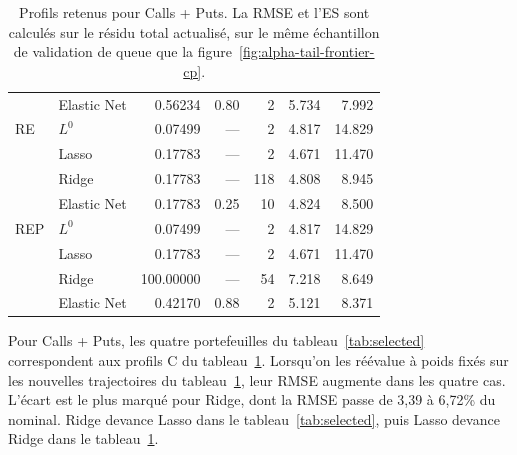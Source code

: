 \documentclass[12pt,a4paper]{article}
\newcommand{\1}{\mathbf{1}}
\begin{document}
\begin{minipage}{\linewidth}
\begin{table}[H]
\begin{tabular}{llrrrrr}
 & Elastic Net & 0.56234 & 0.80 & 2 & 5.734 & 7.992 \\
\addlinespace[2pt]
RE & $L^0$ & 0.07499 & --- & 2 & 4.817 & 14.829 \\
 & Lasso & 0.17783 & --- & 2 & 4.671 & 11.470 \\
 & Ridge & 0.17783 & --- & 118 & 4.808 & 8.945 \\
 & Elastic Net & 0.17783 & 0.25 & 10 & 4.824 & 8.500 \\
\addlinespace[2pt]
REP & $L^0$ & 0.07499 & --- & 2 & 4.817 & 14.829 \\
 & Lasso & 0.17783 & --- & 2 & 4.671 & 11.470 \\
 & Ridge & 100.00000 & --- & 54 & 7.218 & 8.649 \\
 & Elastic Net & 0.42170 & 0.88 & 2 & 5.121 & 8.371 \\
\bottomrule
\end{tabular}
\caption{Profils retenus pour Calls + Puts. La RMSE et l’ES sont calculés sur le résidu total actualisé, sur le même échantillon de validation de queue que la figure~\ref{fig:alpha-tail-frontier-cp}.}
\label{tab:tail-profiles-cp}
\end{table}
\end{minipage}\par


Pour Calls + Puts, les quatre portefeuilles du tableau~\ref{tab:selected} correspondent aux profils C du tableau~\ref{tab:tail-profiles-cp}. Lorsqu'on les réévalue à poids fixés sur les nouvelles trajectoires du tableau~\ref{tab:tail-profiles-cp}, leur RMSE augmente dans les quatre cas. L'écart est le plus marqué pour Ridge, dont la RMSE passe de 3,39 à 6,72\% du nominal. Ridge devance Lasso dans le tableau~\ref{tab:selected}, puis Lasso devance Ridge dans le tableau~\ref{tab:tail-profiles-cp}.
\end{document}

